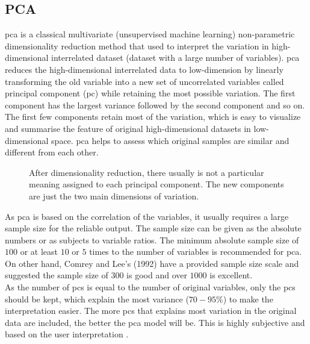 \subsection{PCA}
\label{sec:pca}
\gls{pca} is a classical multivariate (unsupervised machine learning) non-parametric dimensionality reduction method that used to interpret the variation in high-dimensional interrelated dataset (dataset with a large number of variables). \gls{pca} reduces the high-dimensional interrelated data to low-dimension by linearly transforming the old variable into a new set of uncorrelated variables called principal component (\gls{pc}) while retaining the most possible variation. The first component has the largest variance followed by the second component and so on. The first few components retain most of the variation, which is easy to visualize and summarise the feature of original high-dimensional datasets in low-dimensional space. \gls{pca} helps to assess which original samples are similar and different from each other. \\

\begin{figure}[htbp]
	\caption[\gls{pca} - Biplot.]{After dimensionality reduction, there usually is not a particular meaning assigned to each principal component. The new components are just the two main dimensions of variation.}\label{fig:bipca}
\end{figure}

\noindent As \gls{pca} is based on the correlation of the variables, it usually requires a large sample size for the reliable output. The sample size can be given as the absolute numbers or as subjects to variable ratios. The minimum absolute sample size of $100$ or at least $10$ or $5$ times to the number of variables is recommended for \gls{pca}. On other hand, Comrey and Lee’s (1992) have a provided sample size scale and suggested the sample size of $300$ is good and over $1000$ is excellent. \\

\noindent As the number of \glspl{pc} is equal to the number of original variables, only the \glspl{pc} should be kept, which explain the most variance ($70-95\%$) to make the interpretation easier. The more \glspl{pc} that explains most variation in the original data are included, the better the \gls{pca} model will be. This is highly subjective and based on the user interpretation \cite[]{cangelosi2007component}. \\

